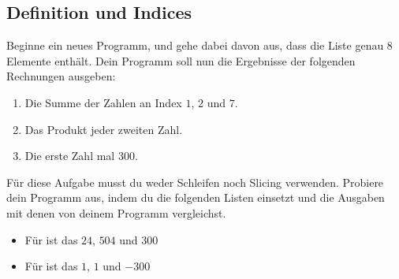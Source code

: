 \subsection{Definition und Indices }

Beginne ein neues Programm, und gehe dabei davon aus, dass die Liste
 genau $8$ Elemente enthält. Dein Programm soll
nun die Ergebnisse der folgenden Rechnungen ausgeben:

\begin{enumerate}
    \item Die Summe der Zahlen an Index $1$, $2$ und $7$.
    \item Das Produkt jeder zweiten Zahl.
    \item Die erste Zahl mal 300.
\end{enumerate}

Für diese Aufgabe musst du weder Schleifen noch Slicing verwenden. Probiere
dein Programm aus, indem du die folgenden Listen einsetzt und die Ausgaben
mit denen von deinem Programm vergleichst.

\begin{itemize}
    \item Für  ist das $24$, $504$ und $300$
    \item Für  ist das $1$, $1$ und $-300$
\end{itemize}
